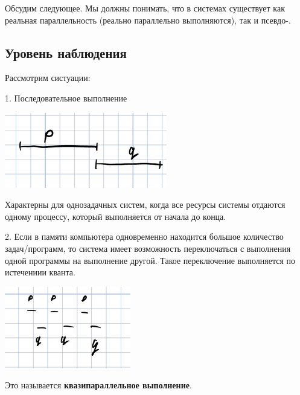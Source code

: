 \documentclass[a4paper, 12pt]{report}
\begin{document}
	Обсудим следующее. Мы должны понимать, что в системах существует как реальная параллельность (реально параллельно выполняются), так и псевдо-.
	
	\subsection*{Уровень наблюдения}
	
	Рассмотрим систуации:
	
	1. Последовательное выполнение
	
	\includegraphics[width=\linewidth]{2}
	
	Характерны для однозадачных систем, когда все ресурсы системы отдаются одному процессу, который выполняется от начала до конца.
	
	2. Если в памяти компьютера одновременно находится большое количество задач/программ, то система имеет возможность переключаться с выполнения одной программы на выполнение другой. Такое переключение выполняется по истечениии кванта.
	
	\includegraphics[width=\linewidth]{3}
	
	Это называется {\bf квазипараллельное выполнение}.
	
\end{document}
